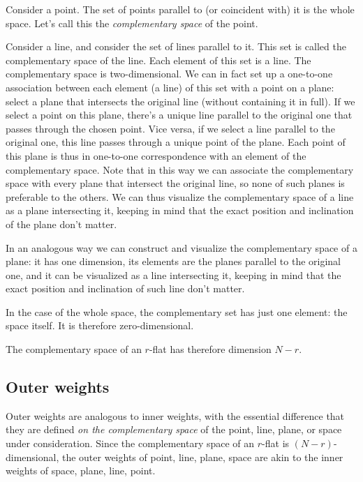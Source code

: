 \documentclass[\ifafour a4paper,12pt,\else a5paper,10pt,\fi%
onecolumn,oneside,article,%
british%
]{memoir}
\theoremstyle{remark}
\theoremstyle{innote}
\renewcommand*{\|}{\nonscript\,\vert\nonscript\;\mathopen{}}
\newcommand*{\+}{\boxplus}
\begin{document}
Consider a point. The set of points parallel to (or coincident with) it is
the whole space. Let's call this the \emph{complementary space} of the point.

Consider a line, and consider the set of lines parallel to it. This set is
called the complementary space of the line. Each element of this set is a
line. The complementary space is two-dimensional. We can in fact set up a
one-to-one association between each element (a line) of this set with a
point on a plane: select a plane that intersects the original line (without
containing it in full). If we select a point on this plane, there's a
unique line parallel to the original one that passes through the chosen
point. Vice versa, if we select a line parallel to the original one, this
line passes through a unique point of the plane. Each point of this plane
is thus in one-to-one correspondence with an element of the complementary
space. Note that in this way we can associate the complementary space with
every plane that intersect the original line, so none of such planes is
preferable to the others. We can thus visualize the complementary space of
a line as a plane intersecting it, keeping in mind that the exact position
and inclination of the plane don't matter.

In an analogous way we can construct and visualize the complementary space
of a plane: it has one dimension, its elements are the planes parallel to
the original one, and it can be visualized as a line intersecting it,
keeping in mind that the exact position and inclination of such line don't
matter.

In the case of the whole space, the complementary set has just one element:
the space itself. It is therefore zero-dimensional.

The complementary space of an $r$-flat has therefore dimension $N-r$.



\subsection{Outer weights}
\label{sec:outer_weights}

Outer weights are analogous to inner weights, with the essential difference
that they are defined \emph{on the complementary space} of the point, line,
plane, or space under consideration. Since the complementary space of an
$r$-flat is $(N-r)$-dimensional, the outer weights of point, line, plane,
space are akin to the inner weights of space, plane, line, point.
\end{document}
